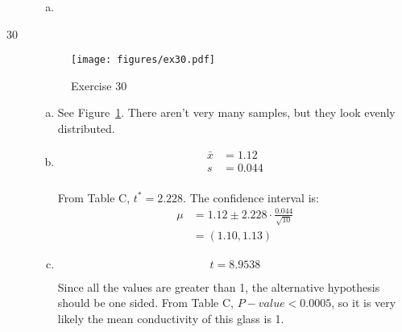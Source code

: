 \documentclass[letterpaper, landscape]{exam}
\begin{document}
\begin{description}
\begin{enumerate}[(a)]
          \item

        \end{enumerate}

      \item[30]
        \begin{figure}[H]
          \centering
          \texttt{[image: figures/ex30.pdf]}
          \caption{Exercise 30}\label{fig:ex30}
        \end{figure}
        
        \begin{enumerate}[(a)]
          \item See Figure~\ref{fig:ex30}. There aren't very many samples, but
            they look evenly distributed.

          \item
            \begin{align*}
              \bar{x} & = 1.12 \\
              s       & = 0.044 \\
            \end{align*}

            From Table C, $t^* = 2.228$. The confidence interval is:
            \begin{align*}
              \mu & = 1.12 \pm 2.228 \cdot \frac{0.044}{\sqrt{10}} \\
                  & = (1.10, 1.13)
            \end{align*}

          \item
            \[
              t = 8.9538
            \]

            Since all the values are greater than 1, the alternative hypothesis
            should be one sided. From Table C, $P-value < 0.0005$, so it is very
            likely the mean conductivity of this glass is 1.
        \end{enumerate}


\end{description}
\end{document}
